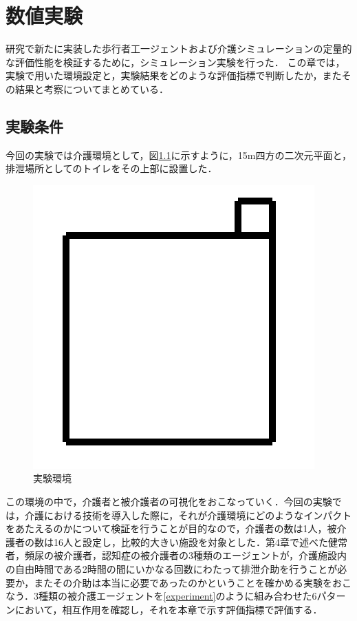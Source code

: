 \chapter{数値実験}

研究で新たに実装した歩行者工一ジェントおよび介護シミュレーションの定量的な評価性能を検証するために，シミュレーション実験を行った．
この章では，実験で用いた環境設定と，実験結果をどのような評価指標で判断したか，またその結果と考察についてまとめている．

\section{実験条件}

今回の実験では介護環境として，図\ref{environment}に示すように，15m四方の二次元平面と，排泄場所としてのトイレをその上部に設置した．

\begin{figure}[htb]
\begin{center}
 \includegraphics[scale=0.5]{figures/environment.png}
 \caption[実験環境]{実験環境 \label{environment}}
\end{center}
\end{figure}

この環境の中で，介護者と被介護者の可視化をおこなっていく．今回の実験では，介護における技術を導入した際に，それが介護環境にどのようなインパクトをあたえるのかについて検証を行うことが目的なので，介護者の数は1人，被介護者の数は16人と設定し，比較的大きい施設を対象とした．第4章で述べた健常者，頻尿の被介護者，認知症の被介護者の3種類のエージェントが，介護施設内の自由時間である2時間の間にいかなる回数にわたって排泄介助を行うことが必要か，またその介助は本当に必要であったのかということを確かめる実験をおこなう．3種類の被介護エージェントを\ref{experiment}のように組み合わせた6パターンにおいて，相互作用を確認し，それを本章で示す評価指標で評価する．

